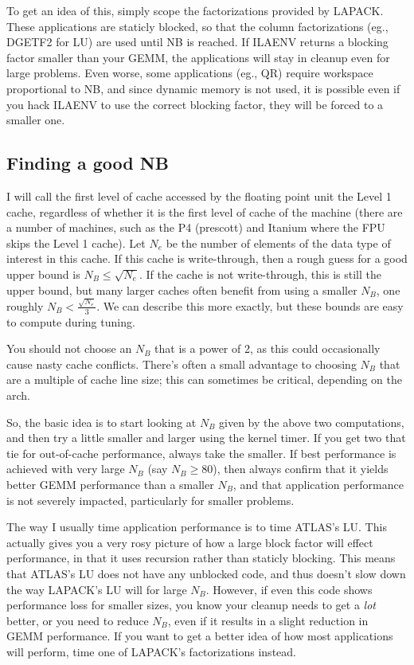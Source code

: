 \documentclass[11pt]{article}
\begin{document}
To get an idea of this, simply scope the factorizations provided by LAPACK.
These applications are staticly blocked, so that 
the column factorizations (eg., DGETF2 for LU) are used until NB is reached.
If ILAENV returns a blocking factor smaller than your GEMM, the applications
will stay in cleanup even for large problems.  Even worse, some applications
(eg., QR) require workspace proportional to NB, and since dynamic memory
is not used, it is possible even if you hack ILAENV to use the correct
blocking factor, they will be forced to a smaller one.

\subsection{Finding a good NB}
I will call the first level of cache accessed by the floating point unit
the Level 1 cache, regardless of whether it is the first level of cache
of the machine (there are a number of machines, such as the P4 (prescott)
and Itanium where the FPU skips the Level 1 cache).  Let $N_e$ be the
number of elements of the data type of interest in this cache.  If this
cache is write-through, then a rough guess for a good upper bound is
$N_B \le \sqrt{N_e}$.  If the cache is not write-through, this is still
the upper bound, but many larger caches often benefit from using a smaller
$N_B$, one roughly $N_B < \frac{\sqrt{N_e}}{3}$.  We can describe this
more exactly, but these bounds are easy to compute during tuning.  

You should not choose an $N_B$ that is a power of 2, as this could occasionally
cause nasty cache conflicts.  There's often a small advantage to choosing
$N_B$ that are a multiple of cache line size; this can sometimes be critical,
depending on the arch.

So, the basic idea is to start looking at $N_B$ given by the above two
computations, and then try a little smaller and larger using the kernel
timer.  If you get two that tie for out-of-cache performance, always take
the smaller.  If best performance is achieved with very large $N_B$ (say
$N_B \ge 80$), then always confirm that it yields better GEMM performance
than a smaller $N_B$, and that application performance is not severely
impacted, particularly for smaller problems.

The way I usually time application performance is to time ATLAS's LU.
This actually gives you a very rosy picture of how a large block factor
will effect performance, in that it uses recursion rather than staticly
blocking.  This means that ATLAS's LU does not have any unblocked code,
and thus doesn't slow down the way LAPACK's LU will for large $N_B$.
However, if even this code shows performance loss for smaller sizes,
you know your cleanup needs to get a {\em lot} better, or you need
to reduce $N_B$, even if it results in a slight reduction in GEMM
performance.
If you want to get a better idea of how most applications will perform,
time one of LAPACK's factorizations instead.
\end{document}
